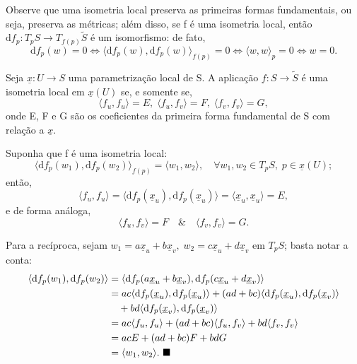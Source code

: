 \documentclass[../differential_geometry.tex]{subfiles}
\begin{document}
Observe que uma isometria local preserva as primeiras formas fundamentais, ou seja, preserva as métricas; além disso, se f é uma isometria local, então \(\mathrm{d}f_p:T_{p}S\rightarrow T_{f(p)}\tilde{S}\) é um isomorfismo: de fato,
\[
	\mathrm{d}f_p(w) = 0 \Longleftrightarrow \langle \mathrm{d}f_p(w), \mathrm{d}f_p(w) \rangle_{f(p)}=0 \Longleftrightarrow \langle w, w \rangle_p = 0 \Longleftrightarrow w = 0.
\]
\begin{prop*}
	Seja \(\underline{x}:U\rightarrow S\) uma parametrização local de S. A aplicação \(f:S\rightarrow \tilde{S}\) é uma isometria local em \(\underline{x}(U)\) se, e somente se,
	\[
		\langle f_u, f_u \rangle = E,\; \langle f_u, f_v \rangle = F,\; \langle f_v, f_v \rangle = G,
	\]
	onde E, F e G são os coeficientes da primeira forma fundamental de S com relação a \(\underline{x}\).
\end{prop*}
\begin{proof*}
	Suponha que f é uma isometria local:
	\[
		\langle \mathrm{d}f_p(w_1), \mathrm{d}f_p(w_2) \rangle_{f(p)} = \langle w_1, w_2 \rangle, \quad \forall w_1, w_2\in T_pS,\; p\in \underline{x}(U);
	\]
	então,
	\[
		\langle f_u, f_u \rangle = \langle \mathrm{d}f_p(\underline{x}_u), \mathrm{d}f_p(\underline{x}_u) \rangle = \langle \underline{x}_u, \underline{x}_u \rangle = E,
	\]
	e de forma análoga,
	\[
		\langle f_u, f_v \rangle = F \quad\&\quad \langle f_v, f_v \rangle = G.
	\]

	Para a recíproca, sejam \(w_1 = a \underline{x}_u + b\underline{x}_v,\; w_2 = c \underline{x}_u + d \underline{x}_v\) em \(T_pS\); basta notar a conta:
	\begin{align*}
		\langle \mathrm{d}f_p(w_1), \mathrm{d}f_p(w_2) \rangle & = \langle \mathrm{d}f_p(a\underline{x}_u + b\underline{x}_v), \mathrm{d}f_p(c\underline{x}_u + d \underline{x}_v) \rangle                                                   \\
		                                                       & = ac \langle \mathrm{d}f_p(\underline{x}_u), \mathrm{d}f_p(\underline{x}_u) \rangle + (ad+bc)\langle \mathrm{d}f_p(\underline{x}_u), \mathrm{d}f_p(\underline{x}_v) \rangle \\
		                                                       & \quad +bd \langle \mathrm{d}f_p(\underline{x}_v), \mathrm{d}f_p(\underline{x}_v) \rangle                                                                                    \\
		                                                       & = ac \langle f_u, f_u \rangle + (ad+bc)\langle f_u, f_v \rangle + bd \langle f_v, f_v \rangle                                                                               \\
		                                                       & = acE + (ad+bc)F + bd G                                                                                                                                                     \\
		                                                       & = \langle w_1, w_2 \rangle. \text{ $\blacksquare$}
	\end{align*}
\end{proof*}
\end{document}

